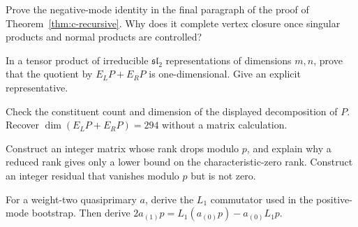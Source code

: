 \begin{exercise}\label{ex:c-closure-1}
Prove the negative-mode identity in the final paragraph of the proof of
Theorem~\ref{thm:c-recursive}. Why does it complete vertex closure once
singular products and normal products are controlled?

\par\smallskip{}\par
\end{exercise}
\begin{exercise}\label{ex:c-closure-2}
In a tensor product of irreducible $\mathfrak{sl}_2$ representations
of dimensions $m,n$, prove that the quotient by $E_LP+E_RP$ is
one-dimensional. Give an explicit representative.

\par\smallskip{}\par
\end{exercise}
\begin{exercise}\label{ex:c-closure-3}
Check the constituent count and dimension of the displayed decomposition
of $P$. Recover $\dim(E_LP+E_RP)=294$ without a matrix calculation.

\par\smallskip{}\par
\end{exercise}
\begin{exercise}\label{ex:c-closure-4}
Construct an integer matrix whose rank drops modulo $p$, and explain
why a reduced rank gives only a lower bound on the characteristic-zero
rank. Construct an integer residual that vanishes modulo $p$ but is
not zero.

\par\smallskip{}\par
\end{exercise}
\begin{exercise}\label{ex:c-closure-5}
For a weight-two quasiprimary $a$, derive the $L_1$ commutator used in
the positive-mode bootstrap. Then derive
$2a_{(1)}p=L_1(a_{(0)}p)-a_{(0)}L_1p$.

\par\smallskip{}\par
\end{exercise}
